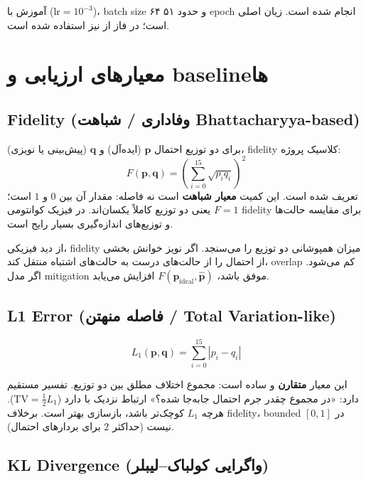 آموزش با  ($\text{lr}=10^{-3}$)، batch size ۶۴ و حدود ۵۱ epoch انجام شده است. زیان اصلی  است؛ در فاز  از  نیز استفاده شده است.

\section{معیارهای ارزیابی و baselineها}

\subsection{Fidelity (وفاداری / شباهت Bhattacharyya-based)}

برای دو توزیع احتمال $\mathbf{p}$ (ایده‌آل) و $\mathbf{q}$ (پیش‌بینی یا نویزی)، fidelity کلاسیک پروژه:
\begin{equation}
	F(\mathbf{p},\mathbf{q})
	=
	\left(\sum_{i=0}^{15}\sqrt{p_i q_i}\right)^2
	\label{eq:fidelity}
\end{equation}
تعریف شده است. این کمیت \textbf{معیار شباهت} است نه فاصله: مقدار آن بین $0$ و $1$ است؛ $F=1$ یعنی دو توزیع کاملاً یکسان‌اند. در فیزیک کوانتومی fidelity برای مقایسه حالت‌ها و توزیع‌های اندازه‌گیری بسیار رایج است.

از دید فیزیکی، fidelity میزان همپوشانی دو توزیع را می‌سنجد. اگر نویز خوانش بخشی از احتمال را از حالت‌های درست به حالت‌های اشتباه منتقل کند، overlap کم می‌شود. اگر مدل mitigation موفق باشد، $F(\mathbf{p}_{\mathrm{ideal}}, \hat{\mathbf{p}})$ افزایش می‌یابد.

\subsection{L1 Error (فاصله منهتن / Total Variation-like)}

\begin{equation}
	L_1(\mathbf{p}, \mathbf{q}) = \sum_{i=0}^{15} |p_i - q_i|
	\label{eq:l1}
\end{equation}

این معیار \textbf{متقارن} و ساده است: مجموع اختلاف مطلق بین دو توزیع. تفسیر مستقیم دارد: «در مجموع چقدر جرم احتمال جابه‌جا شده؟» ارتباط نزدیک با  دارد ($\mathrm{TV} = \frac{1}{2}L_1$). هرچه $L_1$ کوچک‌تر باشد، بازسازی بهتر است. برخلاف fidelity، bounded در $[0,1]$ نیست (حداکثر $2$ برای بردارهای احتمال).

\subsection{KL Divergence (واگرایی کولباک–لیبلر)}

